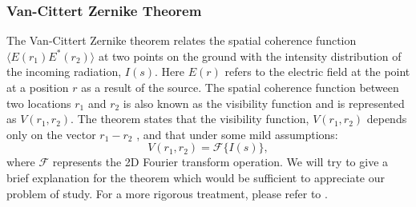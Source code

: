 \subsubsection{Van-Cittert Zernike Theorem}
The Van-Cittert Zernike theorem relates the spatial coherence function $\langle E(r_1)E^*(r_2)\rangle $ at two points on the ground with the intensity distribution of the 
incoming radiation, ${I}(s)$. Here $E(r)$ refers to the electric field at the point at a position $r$ as a result of the source. The spatial coherence function between two locations $r_1$ and $r_2$  is also known as the visibility function and is represented as $V(r_1,r_2)$.
The theorem states that the visibility function, $V(r_1,r_2)$ depends only on the vector $r_1-r_2$ , and that under some mild assumptions:
\begin{equation}
 V(r_1,r_2) = \mathcal{F}\{ I(s)\},
\end{equation}
where $\mathcal{F}$ represents the 2D Fourier transform operation.
We will try to give a brief explanation for the theorem which would be sufficient to appreciate our problem of study. For a more rigorous treatment,
please refer to \cite{ncra_book}.

